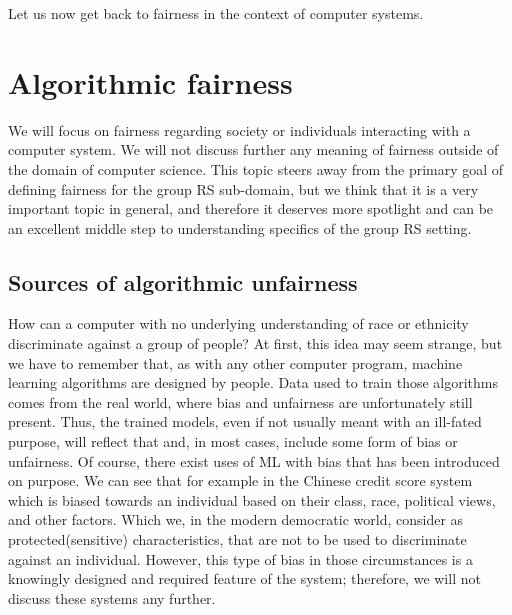 Let us now get back to fairness in the context of computer systems.

\section{Algorithmic fairness}\label{subsec:02_general.algorithmic_fairness_and_possible_meanings}

We will focus on fairness regarding society or individuals interacting with a computer system. We will not discuss further any meaning of fairness outside of the domain of computer science. This topic steers away from the primary goal of defining fairness for the group RS sub-domain, but we think that it is a very important topic in general, and therefore it deserves more spotlight and can be an excellent middle step to understanding specifics of the group RS setting.

\subsection{Sources of algorithmic unfairness}

How can a computer with no underlying understanding of race or ethnicity discriminate against a group of people? At first, this idea may seem strange, but we have to remember that, as with any other computer program, machine learning algorithms are designed by people. Data used to train those algorithms comes from the real world, where bias and unfairness are unfortunately still present. Thus, the trained models, even if not usually meant with an ill-fated purpose, will reflect that and, in most cases, include some form of bias or unfairness.
Of course, there exist uses of ML with bias that has been introduced on purpose. We can see that for example in the Chinese credit score system which is biased towards an individual based on their class, race, political views, and other factors. Which we, in the modern democratic world, consider as protected(sensitive) characteristics, that are not to be used to discriminate against an individual. However, this type of bias in those circumstances is a knowingly designed and required feature of the system; therefore, we will not discuss these systems any further.

